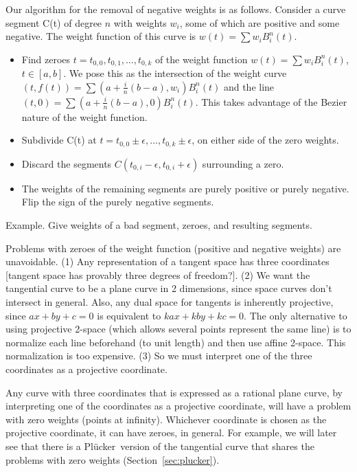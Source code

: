 \documentclass[11pt]{article}
\newcommand{\plucker}{Pl\"{u}cker\ }
\begin{document}
Our algorithm for the removal of negative weights is as follows.
Consider a curve segment C(t) of degree $n$ with weights $w_i$,
some of which are positive and some negative.
The weight function of this curve is $w(t) = \sum w_i B_i^n(t)$.
%
\begin{itemize}
\item Find zeroes $t = t_{0,0},t_{0,1},\ldots,t_{0,k}$ of the weight function
	$w(t) = \sum w_i B_i^n(t)$, $t \in [a,b]$.
	We pose this as the intersection of the weight curve 
	$(t,f(t)) = \sum (a + \frac{i}{n} (b-a), w_i) B_i^n(t)$
	and the line $(t,0) = \sum (a + \frac{i}{n} (b-a), 0)B_i^n(t)$.
	This takes advantage of the Bezier nature of the weight function.
%
\item Subdivide C(t) at $t = t_{0,0} \pm \epsilon,\ldots,t_{0,k} \pm \epsilon$,
	on either side of the zero weights.
\item Discard the segments $C(t_{0,i}-\epsilon,t_{0,i}+\epsilon)$
	surrounding a zero.
\item The weights of the remaining segments are purely positive or
	purely negative.  Flip the sign of the purely negative segments.
\end{itemize}

\begin{example}
Example.
Give weights of a bad segment, zeroes, and resulting segments.
\end{example}

\begin{rmk}
Problems with zeroes of the weight function 
(positive and negative weights) are unavoidable.
(1) Any representation of a tangent space has three coordinates
[tangent space has provably three degrees of freedom?].
(2) We want the tangential curve to be a plane curve in 2 dimensions,
since space curves don't intersect in general.
Also, any dual space for tangents is inherently projective,
since $ax+by+c=0$ is equivalent to $kax+kby+kc=0$.
The only alternative to using projective 2-space (which allows
several points represent the same line) is to normalize each line beforehand
(to unit length) and then use affine 2-space.
This normalization is too expensive.
(3) So we must interpret one of the three coordinates as a projective coordinate.

Any curve with three coordinates that is expressed as a rational plane curve,
by interpreting one of the coordinates as a projective coordinate, will
have a problem with zero weights (points at infinity).
Whichever coordinate is chosen as the projective coordinate, 
it can have zeroes, in general.
For example, we will later see that there is a \plucker version of the 
tangential curve that shares the problems with zero weights
(Section~\ref{sec:plucker}).
\end{rmk}
 
\end{document}

